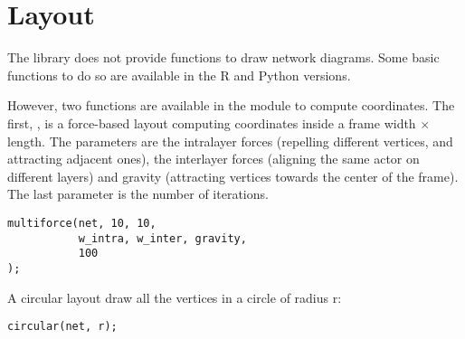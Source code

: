 \chapter{Layout}

The library does not provide functions to draw network diagrams. Some basic functions to do so are available in the R and Python versions.

However, two functions are available in the  module to compute coordinates. The first, , is a force-based layout computing coordinates inside a frame width $\times$ length. The parameters are the intralayer forces (repelling different vertices, and attracting adjacent ones), the interlayer forces (aligning the same actor on different layers) and gravity (attracting vertices towards the center of the frame). The last parameter is the number of iterations.
\begin{lstlisting}[style=c++]
multiforce(net, 10, 10, 
           w_intra, w_inter, gravity,
           100
);
\end{lstlisting}

A circular layout draw all the vertices in a circle of radius r:
\begin{lstlisting}[style=c++]
circular(net, r);
\end{lstlisting}